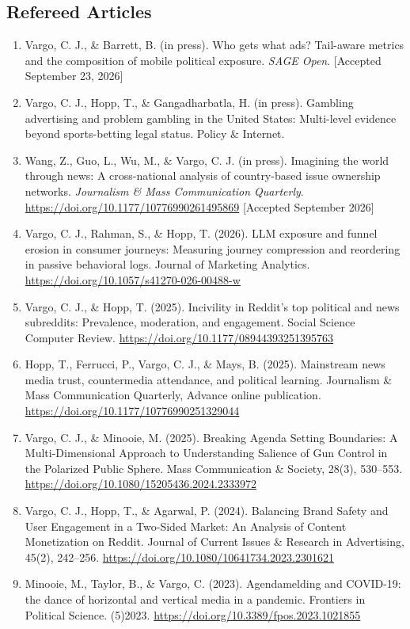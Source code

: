 \documentclass[11pt,letterpaper]{article}
\begin{document}
\subsection*{Refereed Articles}
{\small
\begin{enumerate}
\item Vargo, C. J., \& Barrett, B. (in press). Who gets what ads? Tail-aware metrics and the composition of mobile political exposure. \textit{SAGE Open}. [Accepted September 23, 2026]
\item Vargo, C. J., Hopp, T., \& Gangadharbatla, H. (in press). Gambling advertising and problem gambling in the United States: Multi-level evidence beyond sports-betting legal status. Policy \& Internet.
\item Wang, Z., Guo, L., Wu, M., \& Vargo, C. J. (in press). Imagining the world through news: A cross-national analysis of country-based issue ownership networks. \textit{Journalism \& Mass Communication Quarterly}. \url{https://doi.org/10.1177/10776990261495869} [Accepted September 2026]
\item Vargo, C. J., Rahman, S., \& Hopp, T. (2026). LLM exposure and funnel erosion in consumer journeys: Measuring journey compression and reordering in passive behavioral logs. Journal of Marketing Analytics. \url{https://doi.org/10.1057/s41270-026-00488-w}
\item Vargo, C. J., \& Hopp, T. (2025). Incivility in Reddit's top political and news subreddits: Prevalence, moderation, and engagement. Social Science Computer Review. \url{https://doi.org/10.1177/08944393251395763}
\item Hopp, T., Ferrucci, P., Vargo, C. J., \& Mays, B. (2025). Mainstream news media trust, countermedia attendance, and political learning. Journalism \& Mass Communication Quarterly, Advance online publication. \url{https://doi.org/10.1177/10776990251329044}
\item Vargo, C. J., \& Minooie, M. (2025). Breaking Agenda Setting Boundaries: A Multi-Dimensional Approach to Understanding Salience of Gun Control in the Polarized Public Sphere. Mass Communication \& Society, 28(3), 530--553. \url{https://doi.org/10.1080/15205436.2024.2333972}
\item Vargo, C. J., Hopp, T., \& Agarwal, P. (2024). Balancing Brand Safety and User Engagement in a Two-Sided Market: An Analysis of Content Monetization on Reddit. Journal of Current Issues \& Research in Advertising, 45(2), 242--256. \url{https://doi.org/10.1080/10641734.2023.2301621}
\item Minooie, M., Taylor, B., \& Vargo, C. (2023). Agendamelding and COVID-19: the dance of horizontal and vertical media in a pandemic. Frontiers in Political Science. (5)2023. \url{https://doi.org/10.3389/fpos.2023.1021855}

\end{enumerate}}
\end{document}
